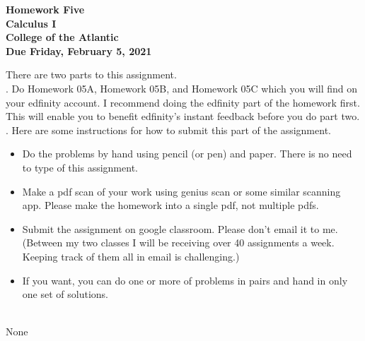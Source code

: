 \documentclass[12pt]{article}
\begin{document}
\pagestyle{empty}
 
\begin{center}
{\LARGE {\bf Homework Five}}\\
\bigskip
{\Large {\bf Calculus I}}\\
\bigskip
{\Large {\bf College of the Atlantic}}\\
\bigskip
{ {\bf Due Friday, February 5, 2021}}\\ 
\end{center}
\medskip


\noindent There are two parts to this assignment.\\

.  Do Homework 05A, Homework 05B, and
Homework 05C which you will find on your edfinity account.  I
recommend doing the edfinity part of the homework first.  This will
enable you to benefit edfinity's instant feedback before you do part
two.\\  


.  Here are some
instructions for how to submit this part of the assignment.
\begin{itemize}
\item Do the problems by hand using pencil (or pen) and paper.
  There is no need to type of this assignment.
\item Make a pdf scan of your work using genius scan or some
  similar scanning app.  Please make the homework into a single
  pdf, not multiple pdfs.
\item Submit the assignment on google classroom.  Please don't
  email it to me.  (Between my two classes I will be receiving
  over 40 assignments a week.  Keeping track of them all in email
  is challenging.)
\item If you want, you can do one or more of problems in pairs and hand 
  in only one set of solutions.\\
\end{itemize}



\\


None\\
\end{document}
